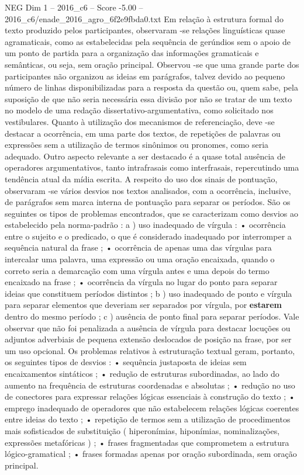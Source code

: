 \begin{textsample}{NEG Dim 1 – 2016\_c6 – Score -5.00 – 2016\_c6/enade\_2016\_agro\_6f2e9fbda0.txt}
Em relação à estrutura formal do texto produzido pelos participantes, observaram -se relações linguísticas quase agramaticais, como as estabelecidas pela sequência de gerúndios sem o apoio de um ponto de partida para a organização das informações gramaticais e semânticas, ou seja, sem oração principal.
Observou -se que uma grande parte dos participantes não organizou as ideias em parágrafos, talvez devido ao pequeno número de linhas disponibilizadas para a resposta da questão ou, quem sabe, pela suposição de que não seria necessária essa divisão por não se tratar de um texto no modelo de uma redação dissertativo-argumentativa, como solicitado nos vestibulares.
Quanto à utilização dos mecanismos de referenciação, deve -se destacar a ocorrência, em uma parte dos textos, de repetições de palavras ou expressões sem a utilização de termos sinônimos ou pronomes, como seria adequado.
Outro aspecto relevante a ser destacado é a quase total ausência de operadores argumentativos, tanto intrafrasais como interfrasais, repercutindo uma tendência atual da mídia escrita.
A respeito do uso dos sinais de pontuação, observaram -se vários desvios nos textos analisados, com a ocorrência, inclusive, de parágrafos sem marca interna de pontuação para separar os períodos.
São os seguintes os tipos de problemas encontrados, que se caracterizam como desvios ao estabelecido pela norma-padrão : a ) uso inadequado de vírgula : • ocorrência entre o sujeito e o predicado, o que é considerado inadequado por interromper a sequência natural da frase ; • ocorrência de apenas uma das vírgulas para intercalar uma palavra, uma expressão ou uma oração encaixada, quando o correto seria a demarcação com uma vírgula antes e uma depois do termo encaixado na frase ; • ocorrência da vírgula no lugar do ponto para separar ideias que constituem períodos distintos ; b ) uso inadequado de ponto e vírgula para separar elementos que deveriam ser separados por vírgula, por \textbf{estarem} dentro do mesmo período ; c ) ausência de ponto final para separar períodos.
Vale observar que não foi penalizada a ausência de vírgula para destacar locuções ou adjuntos adverbiais de pequena extensão deslocados de posição na frase, por ser um uso opcional.
Os problemas relativos à estruturação textual geram, portanto, os seguintes tipos de desvios : • sequência justaposta de ideias sem encaixamentos sintáticos ; • redução de estruturas subordinadas, ao lado do aumento na frequência de estruturas coordenadas e absolutas ; • redução no uso de conectores para expressar relações lógicas essenciais à construção do texto ; • emprego inadequado de operadores que não estabelecem relações lógicas coerentes entre ideias do texto ; • repetição de termos sem a utilização de procedimentos mais sofisticados de substituição ( hiperonímias, hiponímias, nominalizações, expressões metafóricas ) ; • frases fragmentadas que comprometem a estrutura lógico-gramatical ; • frases formadas apenas por oração subordinada, sem oração principal.

\end{textsample}

